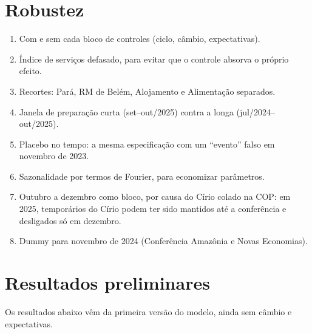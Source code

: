 
\section{Robustez}\label{sec:robustez}

\begin{enumerate}[leftmargin=*]
  \item Com e sem cada bloco de controles (ciclo, câmbio, expectativas).
  \item Índice de serviços defasado, para evitar que o controle absorva o próprio efeito.
  \item Recortes: Pará, RM de Belém, Alojamento e Alimentação separados.
  \item Janela de preparação curta (set--out/2025) contra a longa (jul/2024--out/2025).
  \item Placebo no tempo: a mesma especificação com um ``evento'' falso em novembro de 2023.
  \item Sazonalidade por termos de Fourier, para economizar parâmetros.
  \item Outubro a dezembro como bloco, por causa do Círio colado na COP: em 2025, temporários do Círio
        podem ter sido mantidos até a conferência e desligados só em dezembro.
  \item Dummy para novembro de 2024 (Conferência Amazônia e Novas Economias).
\end{enumerate}


\section{Resultados preliminares}

Os resultados abaixo vêm da primeira versão do modelo, ainda sem câmbio e expectativas.

